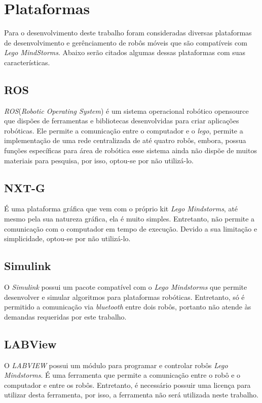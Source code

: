 \section{Plataformas}
\label{sec:plataformas}
Para o desenvolvimento deste trabalho foram consideradas diversas plataformas de desenvolvimento e gerênciamento de robôs móveis que são compatíveis com \emph{Lego MindStorms}. Abaixo serão citados algumas dessas plataformas com suas características.

\subsection{ROS}
\label{subsec:ROS}
\emph{ROS}(\emph{Robotic Operating System}) é um sistema operacional robótico opensource que dispões de ferramentas e bibliotecas desenvolvidas para criar aplicações robóticas.%
Ele permite a comunicação entre o computador e o \emph{lego}, permite a implementação de uma rede centralizada de até quatro robôs, embora, possua funções específicas para área de robótica esse sistema ainda não dispõe de muitos materiais para pesquisa, por isso, optou-se por não  utilizá-lo.

\subsection{NXT-G}
\label{subsec:nxtg}
É uma plataforma gráfica que vem com o próprio kit \emph{Lego Mindstorms}, até mesmo pela sua natureza gráfica, ela é muito simples. Entretanto, não permite a comunicação com o computador em tempo de execução. Devido a sua limitação e simplicidade, optou-se por não utilizá-lo.

\subsection{Simulink}
\label{subsec:simulink}
O \emph{Simulink} possui um pacote compatível com o \emph{Lego Mindstorms} que permite desenvolver e simular algoritmos para plataformas robóticas. Entretanto, só é permitido a comunicação via \emph{bluetooth} entre dois robôs, portanto não atende às demandas requeridas por este trabalho.  

\subsection{LABView}
\label{subsec:labview}
O \emph{LABVIEW} possui um módulo para programar e controlar robôs \emph{Lego Mindstorms}. É uma ferramenta que permite a comunicação entre o robô e o computador e entre os robôs. Entretanto, é necessário possuir uma licença para utilizar desta ferramenta, por isso, a ferramenta não será utilizada neste trabalho.

